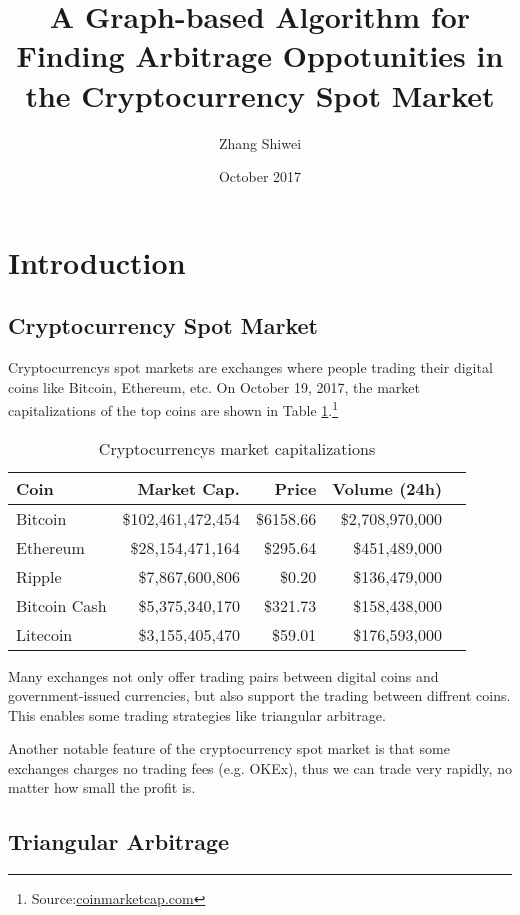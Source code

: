 \documentclass{manuscript}
\title{A Graph-based Algorithm for Finding Arbitrage Oppotunities in the Cryptocurrency Spot Market}
\author{Zhang Shiwei}
\date{October 2017}
\begin{document}
    \maketitle

    \section{Introduction}

    \subsection{Cryptocurrency Spot Market}

    Cryptocurrencys spot markets are exchanges where people trading their digital coins like Bitcoin, Ethereum, etc.
    On October 19, 2017, the market capitalizations of the top coins are shown in Table \ref{Tab:1}.\footnote{Source:\url{coinmarketcap.com}}

    \begin{table}[h]
        \centering
        \begin{tabular}{l *{4}{r}}
            Coin & Market Cap. & Price & Volume (24h) \\
            \hline
            Bitcoin & \$102,461,472,454 & \$6158.66 & \$2,708,970,000 \\
            Ethereum & \$28,154,471,164 & \$295.64 & \$451,489,000 \\
            Ripple & \$7,867,600,806 & \$0.20 & \$136,479,000 \\
            Bitcoin Cash & \$5,375,340,170 & \$321.73 & \$158,438,000 \\
            Litecoin & \$3,155,405,470 & \$59.01 & \$176,593,000 \\
            \hline
        \end{tabular}
        \caption{Cryptocurrencys market capitalizations}\label{Tab:1}
    \end{table}

    Many exchanges not only offer trading pairs between digital coins and government-issued currencies, but also support
    the trading between diffrent coins. This enables some trading strategies like triangular arbitrage.

    Another notable feature of the cryptocurrency spot market is that some exchanges charges no trading fees (e.g. OKEx),
    thus we can trade very rapidly, no matter how small the profit is.

    \subsection{Triangular Arbitrage}\label{triangular arbitrage}
\end{document}
